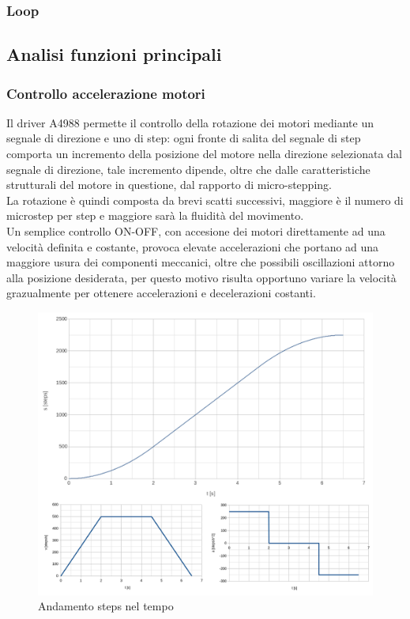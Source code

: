 \documentclass[12pt]{article}
\begin{document}
        \subsubsection{Loop}
        
    \subsection{Analisi funzioni principali}
        \subsubsection{Controllo accelerazione motori}
        Il driver A4988 permette il controllo della rotazione dei motori mediante un segnale di direzione e uno di step: ogni fronte di salita del segnale di step comporta un incremento della posizione del motore nella direzione selezionata dal segnale di direzione, tale incremento dipende, oltre che dalle caratteristiche strutturali del motore in questione, dal rapporto di micro-stepping.\\
        La rotazione è quindi composta da brevi scatti successivi, maggiore è il numero di microstep per step e maggiore sarà la fluidità del movimento.\\
        Un semplice controllo ON-OFF, con accesione dei motori direttamente ad una velocità definita e costante, provoca elevate accelerazioni che portano ad una maggiore usura dei componenti meccanici, oltre che possibili oscillazioni attorno alla posizione desiderata, per questo motivo risulta opportuno variare la velocità grazualmente per ottenere accelerazioni e decelerazioni costanti.\\
        
        \begin{figure}[h]
        \centering
            \includegraphics[width=\textwidth-100pt]{Draws/Motors_s-v-a_block.png}
            \caption{Andamento steps nel tempo}
            \label{Steps_velocity_acceleration_in_time}
        \end{figure}
        
\end{document}
